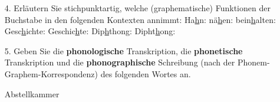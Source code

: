 {\begin{frame}
	\begin{itemize}
		\item[4.] Erläutern Sie stichpunktartig, welche (graphematische) Funktionen der Buchstabe  in den folgenden Kontexten annimmt:
	\eal
			\ex Ha\underline{h}n:
			\bigskip
			\ex nä\underline{h}en:
			\bigskip
			\ex bein\underline{h}alten:
			\bigskip
			\ex Gesc\underline{h}ichte:
			\bigskip
			\ex Geschic\underline{h}te:
			\bigskip
			\ex Dip\underline{h}thong:
			\bigskip
			\ex Dipht\underline{h}ong:
	\zl
	\end{itemize}
\end{frame}

\begin{frame}
	\begin{itemize}
		\item[5.] Geben Sie die \textbf{phonologische} Transkription, die \textbf{phonetische} Transkription und die \textbf{phonographische} Schreibung (nach der Phonem-Graphem-Korrespondenz) des folgenden Wortes an.
		
		\ea Abstellkammer
		\z
		
	\end{itemize}
\end{frame}
}

